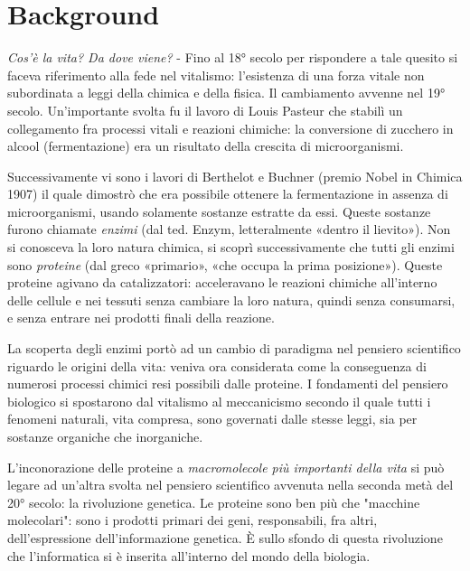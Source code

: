\chapter{Background}

\textit{Cos'è la vita? Da dove viene?} - Fino al 18° secolo per rispondere a tale quesito si faceva riferimento alla fede nel vitalismo: l'esistenza di una forza vitale non subordinata a leggi della chimica e  della fisica.
Il cambiamento avvenne nel 19° secolo.
Un'importante svolta fu il lavoro di Louis Pasteur che stabilì un collegamento fra processi vitali e reazioni chimiche: la conversione di zucchero in alcool (fermentazione) era un risultato della crescita di microorganismi.
\par Successivamente vi sono i lavori di Berthelot e Buchner (premio Nobel in Chimica 1907) il quale dimostrò che era possibile ottenere la fermentazione in assenza di microorganismi, usando solamente sostanze estratte da essi.
Queste sostanze furono chiamate \textit{enzimi} (dal ted. Enzym, letteralmente «dentro il lievito»\cite{enzimaTreccani}). Non si conosceva la loro natura chimica, si scoprì successivamente che tutti gli enzimi sono \textit{proteine} (dal greco «primario», «che occupa la prima posizione»).
Queste proteine agivano da catalizzatori: acceleravano le reazioni chimiche all'interno delle cellule e nei tessuti senza cambiare la loro natura, quindi senza consumarsi, e senza entrare nei prodotti finali della reazione.

\par La scoperta degli enzimi portò ad un cambio di paradigma nel pensiero scientifico riguardo le origini della vita: veniva ora considerata come la conseguenza di numerosi processi chimici resi possibili dalle proteine\cite{kessel_ben-tal_2018}.
I fondamenti del pensiero biologico si spostarono dal vitalismo al meccanicismo secondo il quale tutti i fenomeni naturali, vita compresa, sono governati dalle stesse leggi, sia per sostanze organiche che inorganiche.

\par L'inconorazione delle proteine a \textit{macromolecole più importanti della vita} si può legare ad un'altra svolta nel pensiero scientifico avvenuta nella seconda metà del 20° secolo: la rivoluzione genetica. 
Le proteine sono ben più che "macchine molecolari": sono i prodotti primari dei geni, responsabili, fra altri, dell'espressione dell'informazione genetica. È sullo sfondo di questa rivoluzione che l'informatica si è inserita all'interno del mondo della biologia.

